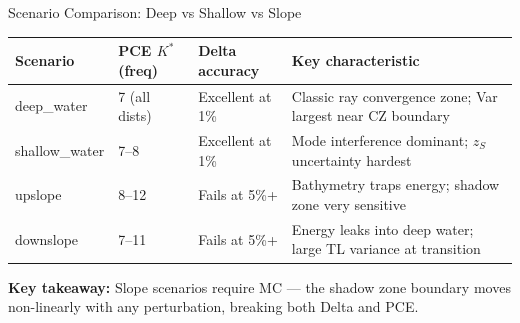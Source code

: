 \documentclass[aspectratio=169,12pt]{beamer}
\begin{document}
\begin{frame}{Scenario Comparison: Deep vs Shallow vs Slope}
  \begin{center}
  \renewcommand{\arraystretch}{1.3}
  {\small
  \begin{tabular}{@{}lp{3.8cm}p{3.8cm}p{4.5cm}@{}}
    \toprule
    \textbf{Scenario} & \textbf{PCE $K^*$ (freq)} & \textbf{Delta accuracy} & \textbf{Key characteristic} \\
    \midrule
    deep\_water   & 7 (all dists) & Excellent at 1\% & Classic ray convergence zone;
                                                       Var largest near CZ boundary \\[4pt]
    shallow\_water & 7--8          & Excellent at 1\% & Mode interference dominant;
                                                        $z_S$ uncertainty hardest \\[4pt]
    upslope       & 8--12         & Fails at 5\%+  & Bathymetry traps energy;
                                                      shadow zone very sensitive \\[4pt]
    downslope     & 7--11         & Fails at 5\%+  & Energy leaks into deep water;
                                                      large TL variance at transition \\
    \bottomrule
  \end{tabular}}
  \end{center}

  \vspace{0.6em}
  \textbf{Key takeaway:} Slope scenarios \alert{require MC} — the shadow zone boundary
  moves non-linearly with any perturbation, breaking both Delta and PCE.
\end{frame}
\end{document}

